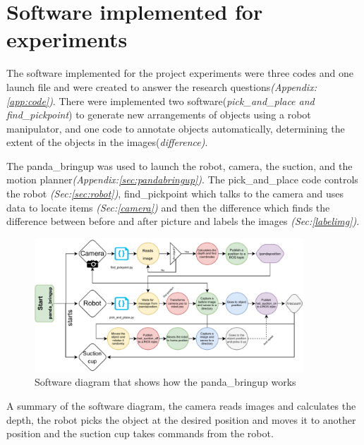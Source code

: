 \section{Software implemented for experiments}
The software implemented for the project experiments were three codes and one launch file and were created to answer the research questions\textit{(Appendix: \ref{app:code})}. There were implemented two software(\textit{pick\_and\_place and find\_pickpoint}) to generate new arrangements of objects using a robot manipulator, and one code to annotate objects automatically, determining the extent of the objects in the images(\textit{difference)}.

The panda\_bringup was used to launch the robot, camera, the suction, and the motion planner\textit{(Appendix:\ref{sec:pandabringup})}. 
The pick\_and\_place code controls the robot \textit{(Sec:\ref{sec:robot})}, 
find\_pickpoint which talks to the camera and uses data to locate items \textit{(Sec:\ref{camera})} and then the difference which finds the difference between before and after picture and labels the images \textit{(Sec:\ref{labelimg})}.


\begin{figure}[h]
    \centering
    \includegraphics[width=0.9\textwidth]{graphics/softwareDiagram.pdf}
    \caption{Software diagram that shows how the panda\_bringup works}
    \label{fig:softwarediagram}
\end{figure}

A summary of the software diagram, the camera reads images and calculates the depth, the robot picks the object at the desired position and moves it to another position and the suction cup takes commands from the robot.

